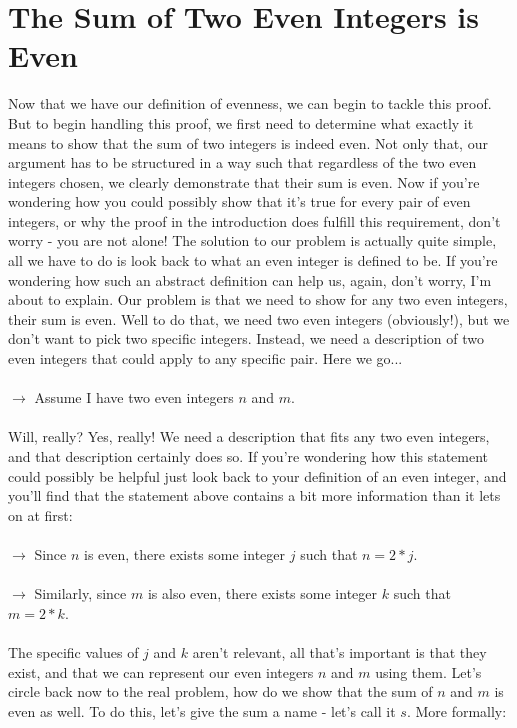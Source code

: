 \documentclass[a4paper,12pt]{article}
\begin{document}
\section{The Sum of Two Even Integers is Even}
Now that we have our definition of evenness, we can begin to tackle this proof. But to begin handling this proof, we first need to determine what exactly it means to show that the sum of two integers is indeed even. Not only that, our argument has to be structured in a way such that regardless of the two even integers chosen, we clearly demonstrate that their sum is even. Now if you're wondering how you could possibly show that it's true for every pair of even integers, or why the proof in the introduction does fulfill this requirement, don't worry - you are not alone! The solution to our problem is actually quite simple, all we have to do is look back to what an even integer is defined to be. If you're wondering how such an abstract definition can help us, again, don't worry, I'm about to explain. Our problem is that we need to show for any two even integers, their sum is even. Well to do that, we need two even integers (obviously!), but we don't want to pick two specific integers. Instead, we need a description of two even integers that could apply to any specific pair. Here we go...\\
\\
$\rightarrow$ Assume I have two even integers $n$ and $m$. \\
\\
Will, really? Yes, really! We need a description that fits any two even integers, and that description certainly does so. If you're wondering how this statement could possibly be helpful just look back to your definition of an even integer, and you'll find that the statement above contains a bit more information than it lets on at first: \\
\\
$\rightarrow$ Since $n$ is even, there exists some integer $j$ such that $n = 2*j$. \\
\\
$\rightarrow$ Similarly, since $m$ is also even, there exists some integer $k$ such that $m = 2*k$. \\
\\
The specific values of $j$ and $k$ aren't relevant, all that's important is that they exist, and that we can represent our even integers $n$ and $m$ using them. Let's circle back now to the real problem, how do we show that the sum of $n$ and $m$ is even as well. To do this, let's give the sum a name - let's call it $s$. More formally:\\ 
\end{document}
